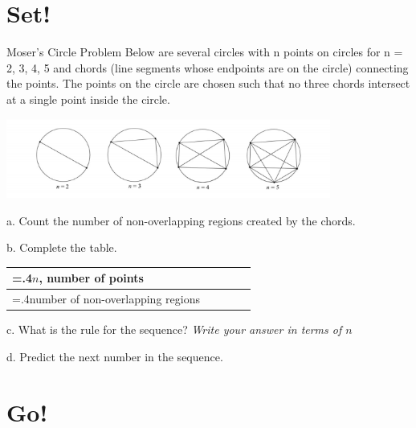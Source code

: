 \documentclass[12pt]{article}
\begin{document}
\section{Set!}
    \begin{problem}{Moser's Circle Problem}
     Below are several circles with n points on circles for n = 2, 3, 4, 5 and chords (line segments whose endpoints are on the circle) connecting the points. The points on the circle are chosen such that no three chords intersect at a single point inside the circle.\\
    
        \begin{center}
            \includegraphics[width=0.8\textwidth]{images/Mosers-Circle-Problem.png}
        \end{center}
     
     a. Count the number of non-overlapping regions created by the chords.
     
     b. Complete the table.
     \begin{center}
\begin{tabularx}{0.8\textwidth} { 
  | >{\hsize=.4\textwidth\raggedleft\arraybackslash}X|| >{\centering\arraybackslash}X | >{\centering\arraybackslash}X | >{\centering\arraybackslash}X | >{\centering\arraybackslash}X | }
 \hline
 $n$, number of points & 2 & 3 & 4 & 5 \\
 \hline
 number of non-overlapping regions  & 2  & 4 &  &  \\
\hline
\end{tabularx}
\end{center}
c. What is the rule for the sequence? \emph{Write your answer in terms of $n$}

d. Predict the next number in the sequence.
    \end{problem}
\section{Go!}
\end{document}

